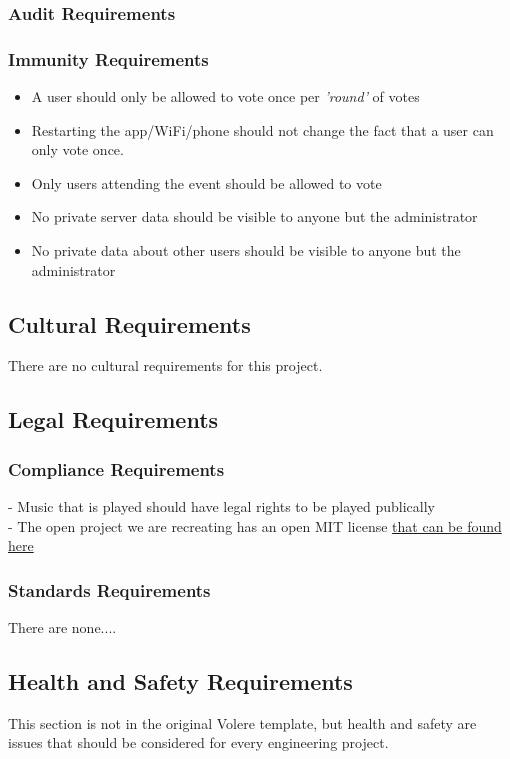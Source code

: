 \documentclass[12pt, titlepage]{article}
\begin{document}
\subsubsection{Audit Requirements}
\subsubsection{Immunity Requirements}
\begin{itemize}
\item A user should only be allowed to vote once per \textit{'round'} of votes
\item Restarting the app/WiFi/phone should not change the fact that a user can
only vote once.
\item Only users attending the event should be allowed to vote
\item No private server data should be visible to anyone but the administrator
\item No private data about other users should be visible to anyone but the
administrator
\end{itemize}

\subsection{Cultural Requirements}
There are no cultural requirements for this project.
\subsection{Legal Requirements}
\subsubsection{Compliance Requirements}

- Music that is played should have legal rights to be played publically \\
- The open project we are recreating has an open MIT license \href{LICENSE.txt} {that can be found here}\\
\subsubsection{Standards Requirements}
There are none....

\subsection{Health and Safety Requirements}


This section is not in the original Volere template, but health and safety are
issues that should be considered for every engineering project.
\end{document}
